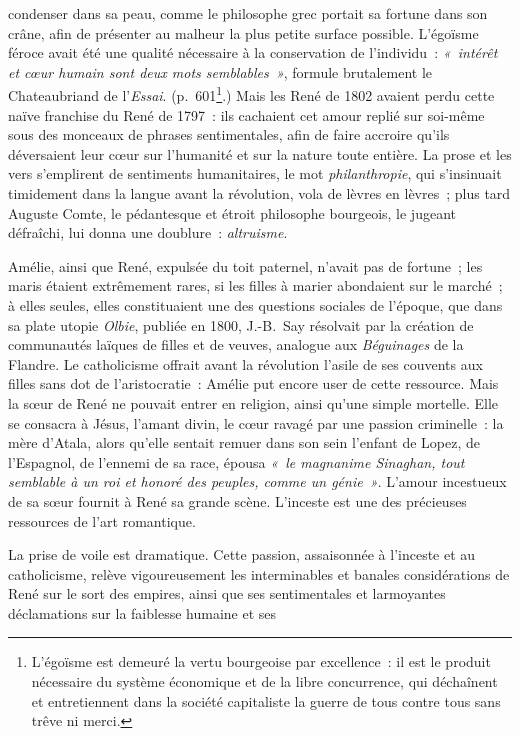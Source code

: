 \documentclass[french,twoside]{book} %
\begin{document}
\label{p593}condenser dans sa peau, comme le philosophe grec portait sa fortune dans son crâne, afin de présenter au malheur la plus petite surface possible. L’égoïsme féroce avait été une qualité nécessaire à la conservation de l’individu : \emph{« intérêt et cœur humain sont deux mots semblables »}, formule brutalement le Chateaubriand de l’\emph{Essai}. (p. 601\footnote{L’égoïsme est demeuré la vertu bourgeoise par excellence : il est le produit nécessaire du système économique et de la libre concurrence, qui déchaînent et entretiennent dans la société capitaliste la guerre de tous contre tous sans trêve ni merci.}.) Mais les René de 1802 avaient perdu cette naïve franchise du René de 1797 : ils cachaient cet amour replié sur soi-même sous des monceaux de phrases sentimentales, afin de faire accroire qu’ils déversaient leur cœur sur l’humanité et sur la nature toute entière. La prose et les vers s’emplirent de sentiments humanitaires, le mot {\itshape philanthropie}, qui s’insinuait timidement dans la langue avant la révolution, vola de lèvres en lèvres ; plus tard Auguste Comte, le pédantesque et étroit philosophe bourgeois, le jugeant défraîchi, lui donna une doublure : {\itshape altruisme}.\par
Amélie, ainsi que René, expulsée du toit paternel, n’avait pas de fortune ; les maris étaient extrêmement rares, si les filles à marier abondaient sur le marché ; à elles seules, elles constituaient une des questions sociales de l’époque, que dans sa plate utopie \emph{Olbie}, publiée en 1800, J.-B. Say résolvait par la création de communautés laïques de filles et de veuves, analogue aux {\itshape Béguinages} de la Flandre. Le catholicisme offrait avant la révolution l’asile de ses couvents aux filles sans dot de l’aristocratie : Amélie put encore user de cette ressource. Mais la sœur de René ne pouvait entrer en religion, ainsi qu’une simple mortelle. Elle se consacra à Jésus, l’amant divin, le cœur ravagé par une passion criminelle : la mère d’Atala, alors qu’elle sentait remuer dans son sein l’enfant de Lopez, de l’Espagnol, de l’ennemi de sa race, épousa \emph{« le magnanime Sinaghan, tout semblable à un roi et honoré des peuples, comme un génie »}. L’amour incestueux de sa sœur fournit à René sa grande scène. L’inceste est une des précieuses ressources de l’art romantique.\par
La prise de voile est dramatique. Cette passion, assaisonnée à l’inceste et au catholicisme, relève vigoureusement les interminables et banales considérations de René sur le sort des empires, ainsi que ses sentimentales et larmoyantes déclamations sur la faiblesse humaine et ses  
\end{document}
